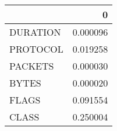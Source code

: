 \begin{tabular}{lr}
\toprule
{} &         0 \\
\midrule
DURATION &  0.000096 \\
PROTOCOL &  0.019258 \\
PACKETS  &  0.000030 \\
BYTES    &  0.000020 \\
FLAGS    &  0.091554 \\
CLASS    &  0.250004 \\
\bottomrule
\end{tabular}
